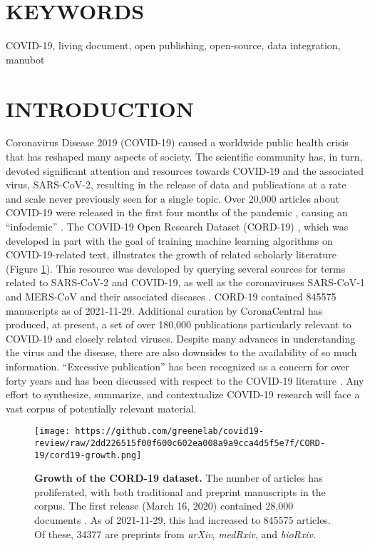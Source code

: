 \documentclass[twocolumn]{ceurart}
\begin{document}
\hypertarget{keywords}{%
\section*{KEYWORDS}\label{keywords}}

COVID-19, living document, open publishing, open-source, data integration, manubot

\hypertarget{introduction}{%
\section{INTRODUCTION}\label{introduction}}

Coronavirus Disease 2019 (COVID-19) caused a worldwide public health crisis that has reshaped many aspects of society.
The scientific community has, in turn, devoted significant attention and resources towards COVID-19 and the associated virus, SARS-CoV-2, resulting in the release of data and publications at a rate and scale never previously seen for a single topic.
Over 20,000 articles about COVID-19 were released in the first four months of the pandemic \citep{7ub6VM4Z}, causing an ``infodemic'' \citep{7ub6VM4Z, nnfOazAC}.
The COVID-19 Open Research Dataset (CORD-19) \citep{CiOwklc6}, which was developed in part with the goal of training machine learning algorithms on COVID-19-related text, illustrates the growth of related scholarly literature (Figure \ref{fig:cord19-growth}).
This resource was developed by querying several sources for terms related to SARS-CoV-2 and COVID-19, as well as the coronaviruses SARS-CoV-1 and MERS-CoV and their associated diseases \citep{CiOwklc6}.
CORD-19 contained 845575 manuscripts as of 2021-11-29.
Additional curation by CoronaCentral \citep{Ybg667S0} has produced, at present, a set of over 180,000 publications particularly relevant to COVID-19 and closely related viruses.
Despite many advances in understanding the virus and the disease, there are also downsides to the availability of so much information.
``Excessive publication'' has been recognized as a concern for over forty years \citep{DfSr1Ohc} and has been discussed with respect to the COVID-19 literature \citep{dUvvJvv6}.
Any effort to synthesize, summarize, and contextualize COVID-19 research will face a vast corpus of potentially relevant material.

\begin{figure}
\hypertarget{fig:cord19-growth}{%
\centering
\texttt{[image: https://github.com/greenelab/covid19-review/raw/2dd226515f00f600c602ea008a9a9cca4d5f5e7f/CORD-19/cord19-growth.png]}
\caption{\textbf{Growth of the CORD-19 dataset.}
The number of articles has proliferated, with both traditional and preprint manuscripts in the corpus.
The first release (March 16, 2020) contained 28,000 documents \citep{CiOwklc6}.
As of 2021-11-29, this had increased to 845575 articles.
Of these, 34377 are preprints from \emph{arXiv}, \emph{medRxiv}, and \emph{bioRxiv}.}\label{fig:cord19-growth}
}
\end{figure}
\end{document}
